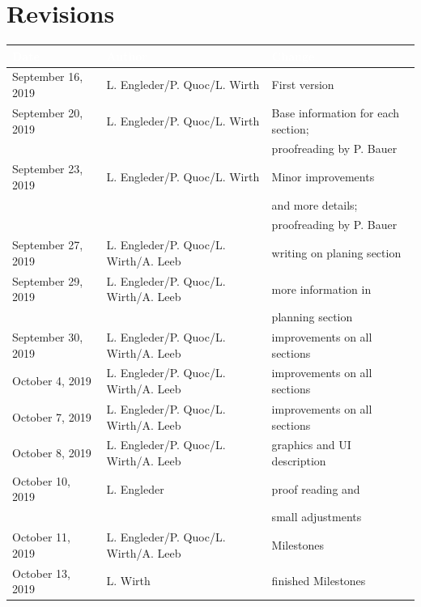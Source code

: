 \documentclass[12pt]{article}
\theoremstyle{definition}
\begin{document}
\section*{Revisions}
\begin{tabular}{|l|l|l|}
\hline
\cellcolor[gray]{0.5}\textcolor{white}{Date} & \cellcolor[gray]{0.5}\textcolor{white}{Author} & \cellcolor[gray]{0.5}\textcolor{white}{Change} \\ \hline
September 16, 2019&L. Engleder/P. Quoc/L. Wirth&First version \\ \hline
September 20, 2019&L. Engleder/P. Quoc/L. Wirth& Base information for each section; \\ && proofreading by P. Bauer \\ \hline
September 23, 2019&L. Engleder/P. Quoc/L. Wirth&Minor improvements \\ && and more details;  \\ && proofreading by P. Bauer \\ \hline
September 27, 2019&L. Engleder/P. Quoc/L. Wirth/A. Leeb&writing on planing section \\ \hline
September 29, 2019&L. Engleder/P. Quoc/L. Wirth/A. Leeb&more information in \\ && planning section \\ \hline
September 30, 2019&L. Engleder/P. Quoc/L. Wirth/A. Leeb& improvements on all sections \\ \hline
October 4, 2019&L. Engleder/P. Quoc/L. Wirth/A. Leeb&improvements on all sections\\ \hline
October 7, 2019&L. Engleder/P. Quoc/L. Wirth/A. Leeb&improvements on all sections\\ \hline
October 8, 2019&L. Engleder/P. Quoc/L. Wirth/A. Leeb&graphics and UI description\\ \hline
October 10, 2019&L. Engleder&proof reading and \\ && small adjustments\\ \hline
October 11, 2019&L. Engleder/P. Quoc/L. Wirth/A. Leeb&Milestones\\ \hline
October 13, 2019&L. Wirth&finished Milestones\\ \hline

\end{tabular}
\pagebreak
 
\tableofcontents
\pagebreak
 
\end{document}
